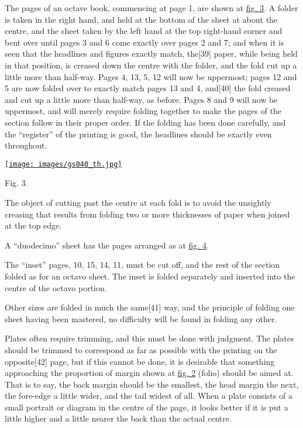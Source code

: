 \documentclass[
]{article}
\begin{document}
The pages of an octave book, commencing at page 1, are shown at
\protect\hyperlink{Fig_3}{fig. 3}. A folder is taken in the right hand,
and held at the bottom of the sheet at about the centre, and the sheet
taken by the left hand at the top right-hand corner and bent over until
pages 3 and 6 come exactly over pages 2 and 7; and when it is seen that
the headlines and figures exactly match,
the{\protect\hypertarget{Page_39}{}{{[}39{]}}} paper, while being held
in that position, is creased down the centre with the folder, and the
fold cut up a little more than half-way. Pages 4, 13, 5, 12 will now be
uppermost; pages 12 and 5 are now folded over to exactly match pages 13
and 4, and{\protect\hypertarget{Page_40}{}{{[}40{]}}} the fold creased
and cut up a little more than half-way, as before. Pages 8 and 9 will
now be uppermost, and will merely require folding together to make the
pages of the section follow in their proper order. If the folding has
been done carefully, and the ``register'' of the printing is good, the
headlines should be exactly even throughout.

\href{images/gs040.jpg}{\texttt{[image: images/gs040\_th.jpg]}}\protect\hypertarget{Fig_3}{}{}

{Fig.} 3.

The object of cutting past the centre at each fold is to avoid the
unsightly creasing that results from folding two or more thicknesses of
paper when joined at the top edge.

A ``duodecimo'' sheet has the pages arranged as at
\protect\hyperlink{Fig_4}{fig. 4}.

The ``inset'' pages, 10, 15, 14, 11, must be cut off, and the rest of
the section folded as for an octavo sheet. The inset is folded
separately and inserted into the centre of the octavo portion.

Other sizes are folded in much the
same{\protect\hypertarget{Page_41}{}{{[}41{]}}} way, and the principle
of folding one sheet having been mastered, no difficulty will be found
in folding any other.

Plates often require trimming, and this must be done with judgment. The
plates should be trimmed to correspond as far as possible with the
printing on the opposite{\protect\hypertarget{Page_42}{}{{[}42{]}}}
page, but if this cannot be done, it is desirable that something
approaching the proportion of margin shown at
\protect\hyperlink{Fig_2}{fig. 2} (folio) should be aimed at. That is to
say, the back margin should be the smallest, the head margin the next,
the fore-edge a little wider, and the tail widest of all. When a plate
consists of a small portrait or diagram in the centre of the page, it
looks better if it is put a little higher and a little nearer the back
than the actual centre.
\end{document}
